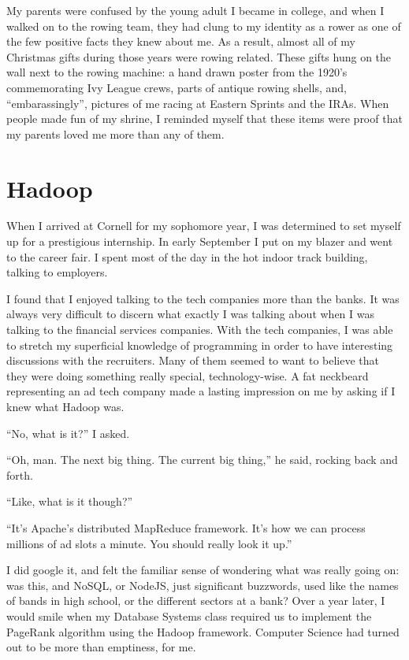 \documentclass[12pt]{article}
\begin{document}
My parents were confused by the young adult I became in college, and
when I walked on to the rowing team, they had clung to my identity
as a rower as one of the few positive facts they knew about me.  As
a result, almost all of my Christmas gifts during those years were
rowing related.  These gifts hung on the wall next to the rowing
machine: a hand drawn poster from the 1920's commemorating Ivy
League crews, parts of antique rowing shells, and, ``embarassingly'',
pictures of me racing at Eastern Sprints and the IRAs.  When people
made fun of my shrine, I reminded myself that these items were proof
that my parents loved me more than any of them.

\section{Hadoop}
When I arrived at Cornell for my sophomore year, I was determined to set
myself up for a prestigious internship.  In early September I put on my
blazer and went to the career fair.  I spent most of the day in the
hot indoor track building, talking to employers. 

I found that I enjoyed talking to the tech companies more than the
banks.  It was always very difficult to discern what exactly I was
talking about when I was talking to the financial services companies.
With the tech companies, I was able to stretch my superficial knowledge
of programming in order to have interesting discussions with the
recruiters.  Many of them seemed to want to believe that they were doing
something really special, technology-wise.  A fat neckbeard representing
an ad tech company made a lasting impression on me by asking if I knew
what Hadoop was.  

``No, what is it?'' I asked.

``Oh, man.  The next big thing.  The current big thing,'' he said,
rocking back and forth.

``Like, what is it though?''

``It's Apache's distributed MapReduce framework.  It's how we can process
millions of ad slots a minute.  You should really look it up.''

I did google it, and felt the familiar sense of wondering what was
really going on: was this, and NoSQL, or NodeJS, just significant
buzzwords, used like the names of bands in high school, or the different
sectors at a bank?   Over a year later, I would smile when my
Database Systems class required us to implement the PageRank algorithm
using the Hadoop framework.  Computer Science had turned out to be more
than emptiness, for me.
\end{document}
